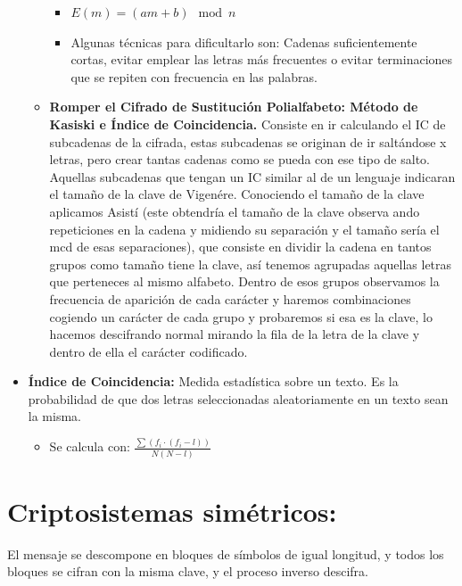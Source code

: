 \documentclass[12pt, twoside, openright]{report} %
\begin{document}
\begin{itemize}
\begin{itemize}
      \begin{itemize}
      \item $E(m)=(am+b) \mod n$
        
      \item Algunas técnicas para dificultarlo son: Cadenas suficientemente
        cortas, evitar emplear las letras más frecuentes o evitar
        terminaciones que se repiten con frecuencia en las palabras.
        
      \end{itemize}
    \item \textbf{Romper el Cifrado de Sustitución Polialfabeto: Método de Kasiski e Índice de Coincidencia.} 
      Consiste en ir calculando el IC de subcadenas de la
      cifrada, estas subcadenas se originan de ir saltándose x letras,
      pero crear tantas cadenas como se pueda con ese tipo de salto.
      Aquellas subcadenas que tengan un IC similar al de un lenguaje
      indicaran el tamaño de la clave de Vigenére. Conociendo el tamaño
      de la clave aplicamos Asistí (este obtendría el tamaño de la
      clave observa ando repeticiones en la cadena y midiendo su
      separación y el tamaño sería el mcd de esas separaciones), que
      consiste en dividir la cadena en tantos grupos como tamaño tiene
      la clave, así tenemos agrupadas aquellas letras que perteneces al
      mismo alfabeto. Dentro de esos grupos observamos la frecuencia de
      aparición de cada carácter y haremos combinaciones cogiendo un
      carácter de cada grupo y probaremos si esa es la clave, lo hacemos
      descifrando normal mirando la fila de la letra de la clave y
      dentro de ella el carácter codificado.
      
    \end{itemize}
	\pagebreak
  \item \textbf{Índice de Coincidencia:} Medida estadística sobre un texto.
    Es la probabilidad de que dos letras seleccionadas aleatoriamente en
    un texto sean la misma.
    

    \begin{itemize}
    \item Se calcula con: $\frac{\sum\limits(f_i \cdot (f_i - l))}{N(N-l)}$
      
    \end{itemize}
  \end{itemize}

  
  \section{Criptosistemas simétricos:} El mensaje se descompone en
  bloques de símbolos de igual longitud, y todos los bloques se cifran
  con la misma clave, y el proceso inverso descifra.
  
\end{document}
